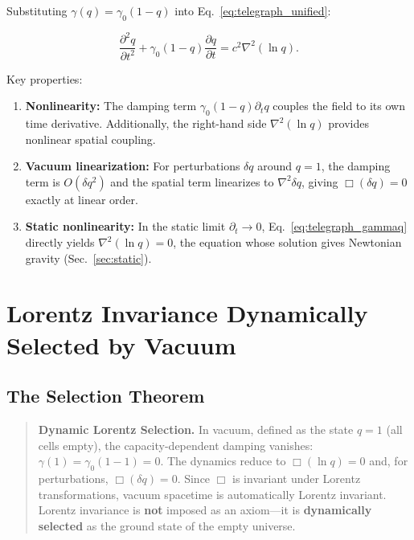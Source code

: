 \documentclass[aps,prd,twocolumn,showpacs,superscriptaddress,preprintnumbers]{revtex4-2}
\begin{document}
Substituting $\gamma(q)=\gamma_0(1-q)$ into Eq.~\eqref{eq:telegraph_unified}:

\begin{equation}
\boxed{\frac{\partial^2 q}{\partial t^2} + \gamma_0(1-q)\frac{\partial q}{\partial t} = c^2\nabla^2(\ln q)}.
\label{eq:telegraph_gammaq}
\end{equation}

Key properties:
\begin{enumerate}
    \item \textbf{Nonlinearity:} The damping term $\gamma_0(1-q)\partial_t q$ couples the field to its own time derivative. Additionally, the right-hand side $\nabla^2(\ln q)$ provides nonlinear spatial coupling.
    \item \textbf{Vacuum linearization:} For perturbations $\delta q$ around $q=1$, the damping term is $O(\delta q^2)$ and the spatial term linearizes to $\nabla^2\delta q$, giving $\Box(\delta q)=0$ exactly at linear order.
    \item \textbf{Static nonlinearity:} In the static limit $\partial_t\to0$, Eq.~\eqref{eq:telegraph_gammaq} directly yields $\nabla^2(\ln q)=0$, the equation whose solution gives Newtonian gravity (Sec.~\ref{sec:static}).
\end{enumerate}

\section{Lorentz Invariance Dynamically Selected by Vacuum}
\label{sec:lorentz}

\subsection{The Selection Theorem}

\begin{quote}
\textbf{Dynamic Lorentz Selection.}
In vacuum, defined as the state $q=1$ (all cells empty), the capacity-dependent damping vanishes: $\gamma(1)=\gamma_0(1-1)=0$.
The dynamics reduce to $\Box(\ln q)=0$ and, for perturbations, $\Box(\delta q)=0$.
Since $\Box$ is invariant under Lorentz transformations, vacuum spacetime is automatically Lorentz invariant.
Lorentz invariance is \textbf{not} imposed as an axiom---it is \textbf{dynamically selected} as the ground state of the empty universe.
\end{quote}
\end{document}
